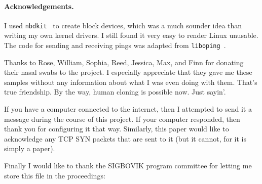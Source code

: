 \documentclass[twocolumn]{article}
\begin{document}
\paragraph{Acknowledgements.}

I used {\tt nbdkit}~\cite{nbdkit} to create block devices, which was a
much sounder idea than writing my own kernel drivers. I still found it
very easy to render Linux unusable. The code for sending and receiving
pings was adapted from {\tt liboping}~\cite{liboping}.

Thanks to Rose, William, Sophia, Reed, Jessica, Max, and Finn for
donating their nasal swabs to the project. I especially appreciate
that they gave me these samples without any information about what I
was even doing with them. That's true friendship. By the way, human
cloning is possible now. Just sayin'.

If you have a computer connected to the internet, then I attempted
to send it a message during the course of this project. If your
computer responded, then thank you for configuring it that way.
Similarly, this paper would like to acknowledge any TCP SYN packets
that are sent to it (but it cannot, for it is simply a paper).

Finally I would like to thank the SIGBOVIK program committee for letting
me store this file in the proceedings:

\end{document}
